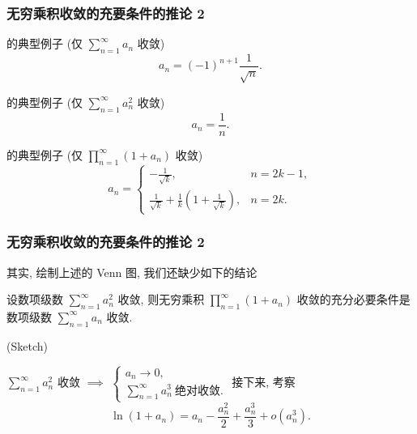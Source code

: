 \begin{frame}
\frametitle{无穷乘积收敛的充要条件的推论 2}

 的典型例子 (仅 $\sum_{n=1}^\infty a_n$ 收敛)
\[
a_n = (-1)^{n+1} \frac{1}{\sqrt{n}}.
\]

\pause

 的典型例子 (仅 $\sum_{n=1}^\infty a_n^2$ 收敛)
\[
a_n = \frac{1}{n}.
\]

\pause

 的典型例子 (仅 $\prod_{n=1}^\infty (1 + a_n)$ 收敛)
\[a_n = \begin{cases}
-\frac{1}{\sqrt{k}}, & n = 2k-1, \\
\frac{1}{\sqrt{k}} + \frac{1}{k} \left( 1 + \frac{1}{\sqrt{k}} \right), & n = 2k.
\end{cases}
\]

\end{frame}


\begin{frame}
\frametitle{无穷乘积收敛的充要条件的推论 2}

其实, 绘制上述的 Venn 图, 我们还缺少如下的结论

\begin{block}
设数项级数 $\sum_{n=1}^\infty a_n^2$ 收敛, 则无穷乘积 $\prod_{n=1}^\infty (1 + a_n)$ 收敛的充分必要条件是数项级数 $\sum_{n=1}^\infty a_n$ 收敛.
\end{block}

\pause

\startproof[bg=yellow, fg=red](Sketch)

$\sum_{n=1}^\infty a_n^2$ 收敛 $\implies$ $\begin{cases} a_n \to 0, \\[3pt] \sum_{n=1}^\infty a_n^3 ~ \text{绝对收敛}. \end{cases}$
\pause
接下来, 考察
\[
\ln(1 + a_n) = a_n - \frac{a_n^2}{2} + \frac{a_n^3}{3} + o\left(a_n^3\right).
\]

\end{frame}


